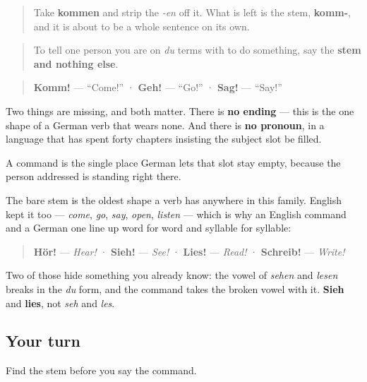 \label{lesson:GE-C33-imperativ}



\begin{quote}
Take \textbf{kommen} and strip the \emph{-en} off it. What is left is the stem, \textbf{komm-}, and it is about to be a whole sentence on its own.
\end{quote}

\begin{grammarlens}[title={Grammar Lens: the stem, alone}]
\begin{quote}
To tell one person you are on \emph{du} terms with to do something, say the \textbf{stem and nothing else}.
\end{quote}

\begin{quote}
\textbf{Komm!} — \textquotedblleft{}Come!\textquotedblright{} · \textbf{Geh!} — \textquotedblleft{}Go!\textquotedblright{} · \textbf{Sag!} — \textquotedblleft{}Say!\textquotedblright{}
\end{quote}

Two things are missing, and both matter. There is \textbf{no ending} — this is the one shape of a German verb that wears none. And there is \textbf{no pronoun}, in a language that has spent forty chapters insisting the subject slot be filled.

A command is the single place German lets that slot stay empty, because the person addressed is standing right there.
\end{grammarlens}

\begin{cousinweb}
The bare stem is the oldest shape a verb has anywhere in this family. English kept it too — \emph{come}, \emph{go}, \emph{say}, \emph{open}, \emph{listen} — which is why an English command and a German one line up word for word and syllable for syllable:

\begin{quote}
\textbf{Hör!} — \emph{Hear!} · \textbf{Sieh!} — \emph{See!} · \textbf{Lies!} — \emph{Read!} · \textbf{Schreib!} — \emph{Write!}
\end{quote}

Two of those hide something you already know: the vowel of \emph{sehen} and \emph{lesen} breaks in the \emph{du} form, and the command takes the broken vowel with it. \textbf{Sieh} and \textbf{lies}, not \emph{seh} and \emph{les}.
\end{cousinweb}

\subsection*{Your turn}
Find the stem before you say the command.

